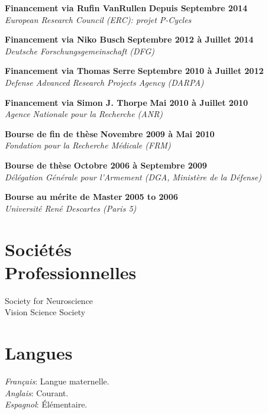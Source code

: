 \documentclass[margin,line]{resume}
\begin{document}
\begin{resume}
 	\textbf{Financement via Rufin VanRullen} \hfill \textbf{Depuis Septembre 2014}\\
 	\textsl{European Research Council (ERC): projet P-Cycles}
 
	\vspace{-2mm} 
	\textbf{Financement via Niko Busch} \hfill \textbf{Septembre 2012 à Juillet 2014}\\
	\textsl{Deutsche Forschungsgemeinschaft (DFG)}

	\vspace{-2mm} 
	\textbf{Financement via Thomas Serre} \hfill \textbf{Septembre 2010 à Juillet 2012}\\
	\textsl{Defense Advanced Research Projects Agency (DARPA)}

	\vspace{-2mm} 
	\textbf{Financement via Simon J. Thorpe} \hfill \textbf{Mai 2010 à Juillet 2010}\\
	\textsl{Agence Nationale pour la Recherche (ANR)}
		
	\vspace{-2mm} 
	\textbf{Bourse de fin de thèse} \hfill \textbf{Novembre 2009 à Mai 2010}\\
	\textsl{Fondation pour la Recherche Médicale (FRM)}
		
	\vspace{-2mm} 
	\textbf{Bourse de thèse} \hfill \textbf{Octobre 2006 à Septembre 2009}\\ %
	\textsl{Délégation Générale pour l'Armement (DGA, Ministère de la Défense)}
	
	\vspace{-2mm} 
	\textbf{Bourse au mérite  de Master} \hfill \textbf{2005 to 2006}\\
	\textsl{Université René Descartes (Paris 5)}	



\vspace{3mm}
\section{\mysidestyle Sociétés\\Professionnelles}
	Society for Neuroscience\\
	Vision Science Society

	
\vspace{3mm}
\section{\mysidestyle Langues}
	\textsl{Français}: Langue maternelle.\\
	\textsl{Anglais}: Courant.\\
	\textsl{Espagnol}: \'Elémentaire.



\end{resume}
\end{document}
